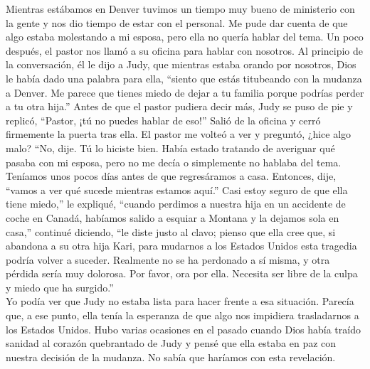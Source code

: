\documentclass[twoside, 12pt]{book}
\begin{document}
Mientras estábamos en Denver tuvimos un tiempo muy bueno de ministerio con la gente y nos dio tiempo de estar con el personal. Me pude dar cuenta de que algo estaba molestando a mi esposa, pero ella no quería hablar del tema. Un poco después, el pastor nos llamó a su oficina para hablar con nosotros. Al principio de la conversación, él le dijo a Judy, que mientras estaba orando por nosotros, Dios le había dado una palabra para ella, “siento que estás titubeando con la mudanza a Denver. Me parece que tienes miedo de dejar a tu familia porque podrías perder a tu otra hija.” Antes de que el pastor pudiera decir más, Judy se puso de pie y replicó, “Pastor, ¡tú no puedes hablar de eso!” Salió de la oficina y cerró firmemente la puerta tras ella. El pastor me volteó a ver y preguntó, ¿hice algo malo? “No, dije. Tú lo hiciste bien. Había estado tratando de averiguar qué pasaba con mi esposa, pero no me decía o simplemente no hablaba del tema. Teníamos unos pocos días antes de que regresáramos a casa. Entonces, dije, “vamos a ver qué sucede mientras estamos aquí.” Casi estoy seguro de que ella tiene miedo,” le expliqué, “cuando perdimos a nuestra hija en un accidente de coche en Canadá, habíamos salido a esquiar a Montana y la dejamos sola en casa,” continué diciendo, “le diste justo al clavo; pienso que ella cree que, si abandona a su otra hija Kari, para mudarnos a los Estados Unidos esta tragedia podría volver a suceder. Realmente no se ha perdonado a sí misma, y otra pérdida sería muy dolorosa. Por favor, ora por ella. Necesita ser libre de la culpa y miedo que ha surgido.”\\

Yo podía ver que Judy no estaba lista para hacer frente a esa situación. Parecía que, a ese punto, ella tenía la esperanza de que algo nos impidiera trasladarnos a los Estados Unidos. Hubo varias ocasiones en el pasado cuando Dios había traído sanidad al corazón quebrantado de Judy y pensé que ella estaba en paz con nuestra decisión de la mudanza. No sabía que haríamos con esta revelación.\\
\end{document}
